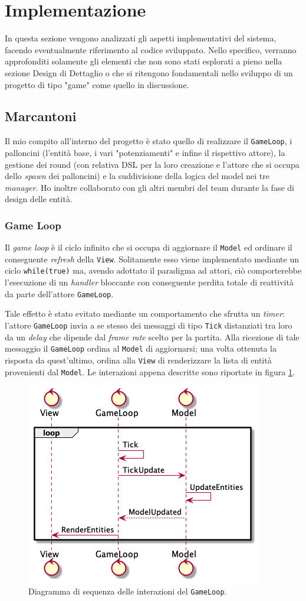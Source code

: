 \newpage
\section{Implementazione}
In questa sezione vengono analizzati gli aspetti implementativi del sistema, facendo eventualmente riferimento al codice
sviluppato. Nello specifico, verranno approfonditi solamente gli elementi che non sono stati esplorati a pieno nella
sezione Design di Dettaglio o che si ritengono fondamentali nello sviluppo di un progetto di tipo "game" come quello in
discussione.


\subsection{Marcantoni}
Il mio compito all'interno del progetto è stato quello di realizzare il \texttt{GameLoop}, i palloncini (l'entità base,
i vari "potenziamenti" e infine il rispettivo attore), la gestione dei round (con relativa DSL per la loro creazione e
l'attore che si occupa dello \textit{spawn} dei palloncini) e la suddivisione della logica del model nei tre
\textit{manager}. Ho inoltre collaborato con gli altri membri del team durante la fase di design delle entità.

\subsubsection{Game Loop}
Il \textit{game loop} è il ciclo infinito che si occupa di aggiornare il \texttt{Model} ed ordinare il conseguente
\textit{refresh} della \texttt{View}. Solitamente esso viene implementato mediante un ciclo \texttt{while(true)} ma,
avendo adottato il paradigma ad attori, ciò comporterebbe l'esecuzione di un \textit{handler} bloccante con
conseguente perdita totale di reattività da parte dell'attore \texttt{GameLoop}.

Tale effetto è stato evitato mediante un comportamento che sfrutta un \textit{timer}: l'attore \texttt{GameLoop} invia a
se stesso dei messaggi di tipo \texttt{Tick} distanziati tra loro da un \textit{delay} che dipende dal
\textit{frame rate} scelto per la partita. Alla ricezione di tale messaggio il \texttt{GameLoop} ordina al
\texttt{Model} di aggiornarsi; una volta ottenuta la risposta da quest'ultimo, ordina alla \texttt{View} di renderizzare
la lista di entità provenienti dal \texttt{Model}. Le interazioni appena descritte sono riportate in figura
\ref{fig:sequence-gameloop}.

\begin{figure}[H]
  \centering
  \includegraphics[width=.5\linewidth]{img/sequence-gameloop}
  \caption{Diagramma di sequenza delle interazioni del \texttt{GameLoop}.}
  \label{fig:sequence-gameloop}
\end{figure}

